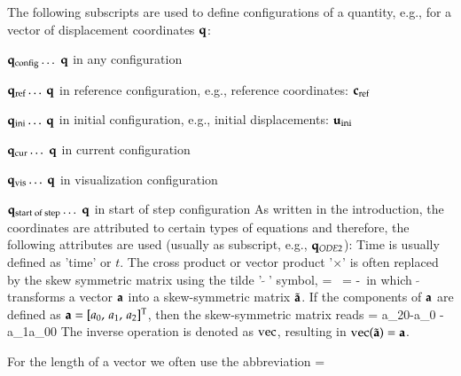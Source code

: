 %
The following subscripts are used to define configurations of a quantity, e.g., for a vector of displacement coordinates $\qv$:
\bi
  \item $\qv\cConfig \ldots$ $\qv$ in any configuration
  \item $\qv\cRef \ldots$ $\qv$ in reference configuration, e.g., reference coordinates: $\cv\cRef$
  \item $\qv\cIni \ldots$ $\qv$ in initial configuration, e.g., initial displacements: $\uv\cIni$
  \item $\qv\cCur \ldots$ $\qv$ in current configuration
  \item $\qv\cVis \ldots$ $\qv$ in visualization configuration
  \item $\qv\cSOS \ldots$ $\qv$ in start of step configuration
\ei
As written in the introduction, the coordinates are attributed to certain types of equations and therefore, the following attributes are used (usually as subscript, e.g., $\qv_{ODE2}$):
Time is usually defined as 'time' or $t$.
The cross product or vector product '$\times$' is often replaced by the skew symmetric matrix using the tilde '$\tilde{\;\;}$' symbol,
\be
  \av \times \bv = \tilde \av \, \bv = -\tilde \bv \, \av \eqComma
\ee
in which $\tilde{\;\;}$ transforms a vector $\av$ into a skew-symmetric matrix $\tilde \av$.
If the components of $\av$ are defined as $\av = \vrRow{a_0}{a_1}{a_2}\tp$, then the skew-symmetric matrix reads
\be
  \tilde \av =  {a_2}{0}{-a_0} {-a_1}{a_0}{0} \eqDot
\ee
The inverse operation is denoted as $\vec$, resulting in $\vec(\tilde \av) = \av$.

For the length of a vector we often use the abbreviation 
\be \label{eq:definition:length}
  \Vert \av \Vert =  \eqDot
\ee

